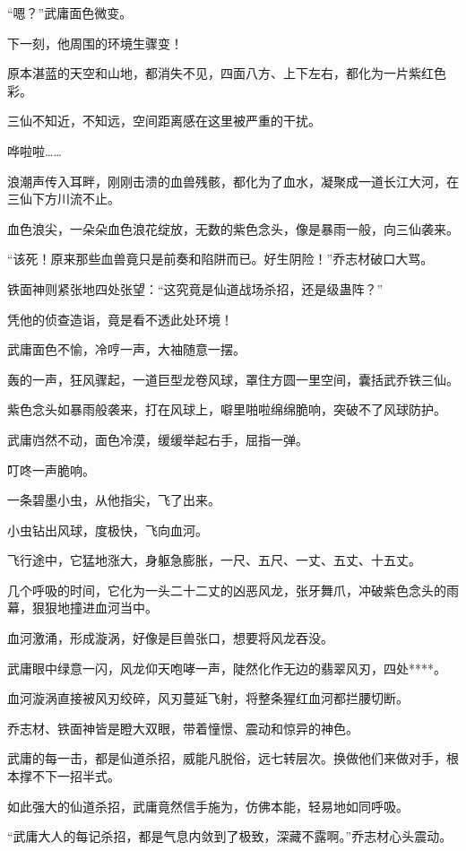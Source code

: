 \begin{this_body}
“嗯？”武庸面色微变。

下一刻，他周围的环境生骤变！

原本湛蓝的天空和山地，都消失不见，四面八方、上下左右，都化为一片紫红色彩。

三仙不知近，不知远，空间距离感在这里被严重的干扰。

哗啦啦……

浪潮声传入耳畔，刚刚击溃的血兽残骸，都化为了血水，凝聚成一道长江大河，在三仙下方川流不止。

血色浪尖，一朵朵血色浪花绽放，无数的紫色念头，像是暴雨一般，向三仙袭来。

“该死！原来那些血兽竟只是前奏和陷阱而已。好生阴险！”乔志材破口大骂。

铁面神则紧张地四处张望：“这究竟是仙道战场杀招，还是级蛊阵？”

凭他的侦查造诣，竟是看不透此处环境！

武庸面色不愉，冷哼一声，大袖随意一摆。

轰的一声，狂风骤起，一道巨型龙卷风球，罩住方圆一里空间，囊括武乔铁三仙。

紫色念头如暴雨般袭来，打在风球上，噼里啪啦绵绵脆响，突破不了风球防护。

武庸岿然不动，面色冷漠，缓缓举起右手，屈指一弹。

叮咚一声脆响。

一条碧墨小虫，从他指尖，飞了出来。

小虫钻出风球，度极快，飞向血河。

飞行途中，它猛地涨大，身躯急膨胀，一尺、五尺、一丈、五丈、十五丈。

几个呼吸的时间，它化为一头二十二丈的凶恶风龙，张牙舞爪，冲破紫色念头的雨幕，狠狠地撞进血河当中。

血河激涌，形成漩涡，好像是巨兽张口，想要将风龙吞没。

武庸眼中绿意一闪，风龙仰天咆哮一声，陡然化作无边的翡翠风刃，四处****。

血河漩涡直接被风刃绞碎，风刃蔓延飞射，将整条猩红血河都拦腰切断。

乔志材、铁面神皆是瞪大双眼，带着憧憬、震动和惊异的神色。

武庸的每一击，都是仙道杀招，威能凡脱俗，远七转层次。换做他们来做对手，根本撑不下一招半式。

如此强大的仙道杀招，武庸竟然信手施为，仿佛本能，轻易地如同呼吸。

“武庸大人的每记杀招，都是气息内敛到了极致，深藏不露啊。”乔志材心头震动。


\end{this_body}
